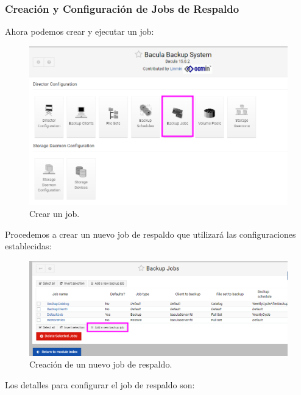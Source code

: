 \smallskip






\subsubsection{Creación y Configuración de Jobs de Respaldo}
Ahora podemos crear y ejecutar un job:

\begin{figure}[H]
    \centering
    \includegraphics[width=0.5\linewidth]{instalacionBacula/createJOB.png}
    \caption{Crear un job.}
\end{figure}
Procedemos a crear un nuevo job de respaldo que utilizará las configuraciones establecidas:

\begin{figure}[H]
    \centering
    \includegraphics[width=0.5\linewidth]{instalacionBacula/createnewjob.png}
    \caption{Creación de un nuevo job de respaldo.}
\end{figure}

Los detalles para configurar el job de respaldo son:


